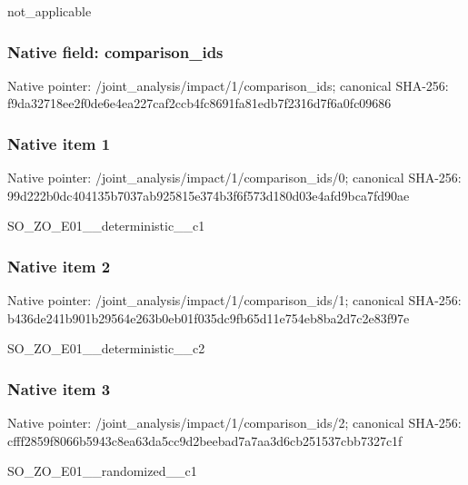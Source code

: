 \documentclass[10pt,a4paper]{article}
\begin{document}
\begingroup\raggedright\sloppy not\_\allowbreak{}applicable\par\endgroup

\subsubsection{Native field: comparison\_\allowbreak{}ids}
Native pointer: /joint\_\allowbreak{}analysis/impact/1/comparison\_\allowbreak{}ids; canonical SHA-256: f9da32718ee2f0de6e4ea227caf2ccb4fc8691fa81edb7f2316d7f6a0fc09686

\subsubsection{Native item 1}
Native pointer: /joint\_\allowbreak{}analysis/impact/1/comparison\_\allowbreak{}ids/0; canonical SHA-256: 99d222b0dc404135b7037ab925815e374b3f6f573d180d03e4afd9bca7fd90ae

\begingroup\raggedright\sloppy SO\_\allowbreak{}ZO\_\allowbreak{}E01\_\allowbreak{}\_\allowbreak{}deterministic\_\allowbreak{}\_\allowbreak{}c1\par\endgroup

\subsubsection{Native item 2}
Native pointer: /joint\_\allowbreak{}analysis/impact/1/comparison\_\allowbreak{}ids/1; canonical SHA-256: b436de241b901b29564e263b0eb01f035dc9fb65d11e754eb8ba2d7c2e83f97e

\begingroup\raggedright\sloppy SO\_\allowbreak{}ZO\_\allowbreak{}E01\_\allowbreak{}\_\allowbreak{}deterministic\_\allowbreak{}\_\allowbreak{}c2\par\endgroup

\subsubsection{Native item 3}
Native pointer: /joint\_\allowbreak{}analysis/impact/1/comparison\_\allowbreak{}ids/2; canonical SHA-256: cfff2859f8066b5943c8ea63da5cc9d2beebad7a7aa3d6cb251537cbb7327c1f

\begingroup\raggedright\sloppy SO\_\allowbreak{}ZO\_\allowbreak{}E01\_\allowbreak{}\_\allowbreak{}randomized\_\allowbreak{}\_\allowbreak{}c1\par\endgroup
\end{document}
